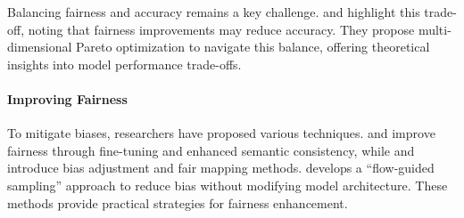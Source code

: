 Balancing fairness and accuracy remains a key challenge. \citet{ferrara2023fairness} and \citet{wang2021understanding} highlight this trade-off, noting that fairness improvements may reduce accuracy. They propose multi-dimensional Pareto optimization to navigate this balance, offering theoretical insights into model performance trade-offs.

\paragraph{Improving Fairness}

To mitigate biases, researchers have proposed various techniques. \citet{jiang2024mitigating} and \citet{shen2023finetuning} improve fairness through fine-tuning and enhanced semantic consistency, while \citet{friedrich2023fair} and \citet{li2023fair} introduce bias adjustment and fair mapping methods. \citet{su2023manifold} develops a ``flow-guided sampling'' approach to reduce bias without modifying model architecture. These methods provide practical strategies for fairness enhancement.